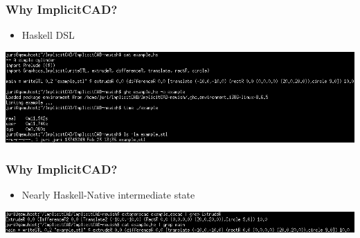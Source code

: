 \documentclass{beamer}
\begin{document}
\begin{frame}
  \frametitle{Why ImplicitCAD?}
\begin{itemize}
\item Haskell DSL
\end{itemize}
\includegraphics[width=1.0\textwidth, center]{haskell_example_000.png}
\end{frame}

\begin{frame}
  \frametitle{Why ImplicitCAD?}
\begin{itemize}
\item Nearly Haskell-Native intermediate state
\end{itemize}
\includegraphics[width=1.0\textwidth, center]{haskell_intermediate.png}
\end{frame}
\end{document}
